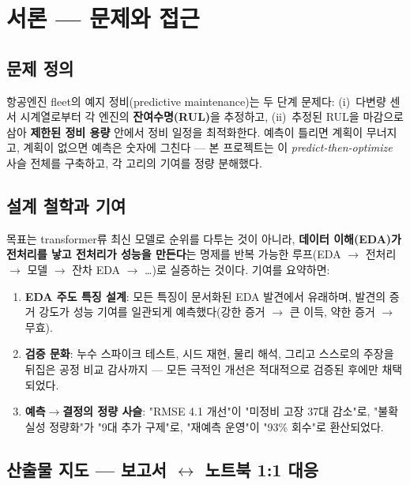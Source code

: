 \documentclass[11pt]{article}
\begin{document}
\section{서론 — 문제와 접근}

\subsection{문제 정의}

항공엔진 fleet의 예지 정비(predictive maintenance)는 두 단계 문제다:
(i)~다변량 센서 시계열로부터 각 엔진의 \textbf{잔여수명(RUL)}을 추정하고,
(ii)~추정된 RUL을 마감으로 삼아 \textbf{제한된 정비 용량} 안에서 정비 일정을 최적화한다.
예측이 틀리면 계획이 무너지고, 계획이 없으면 예측은 숫자에 그친다 —
본 프로젝트는 이 \emph{predict-then-optimize} 사슬 전체를 구축하고, 각 고리의 기여를 정량 분해했다.

\subsection{설계 철학과 기여}

목표는 transformer류 최신 모델로 순위를 다투는 것이 아니라,
\textbf{데이터 이해(EDA)가 전처리를 낳고 전처리가 성능을 만든다}는 명제를
반복 가능한 루프(EDA $\to$ 전처리 $\to$ 모델 $\to$ 잔차 EDA $\to$ \dots)로 실증하는 것이다.
기여를 요약하면:

\begin{enumerate}[nosep]
  \item \textbf{EDA 주도 특징 설계}: 모든 특징이 문서화된 EDA 발견에서 유래하며,
        발견의 증거 강도가 성능 기여를 일관되게 예측했다(강한 증거 $\to$ 큰 이득, 약한 증거 $\to$ 무효).
  \item \textbf{검증 문화}: 누수 스파이크 테스트, 시드 재현, 물리 해석, 그리고 스스로의 주장을 뒤집은
        공정 비교 감사까지 — 모든 극적인 개선은 적대적으로 검증된 후에만 채택되었다.
  \item \textbf{예측$\to$결정의 정량 사슬}: "RMSE 4.1 개선"이 "미정비 고장 37대 감소"로,
        "불확실성 정량화"가 "9대 추가 구제"로, "재예측 운영"이 "93\% 회수"로 환산되었다.
\end{enumerate}

\subsection{산출물 지도 — 보고서 $\leftrightarrow$ 노트북 1:1 대응}
\end{document}

